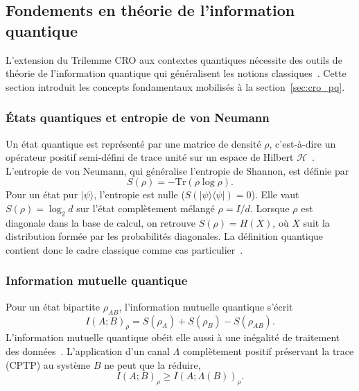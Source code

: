 \subsection{Fondements en th\'eorie de l'information quantique}
\label{subsec:fondements_info_quantique}
\begin{sloppypar}
L'extension du Trilemme CRO
aux contextes quantiques n\'ecessite des outils de th\'eorie de l'information
quantique qui g\'en\'eralisent les notions classiques~\cite{NielsenChuang2010,Wilde2017,Holevo1973}. Cette section introduit
les concepts fondamentaux mobilis\'es \`a la section~\ref{sec:cro_pq}.

\subsubsection{\'Etats quantiques et entropie de von Neumann}
\label{subsubsec:von_neumann}

Un \'etat quantique est repr\'esent\'e par une matrice de densit\'e $\rho$, c'est-\`a-dire un
op\'erateur positif semi-d\'efini de trace unit\'e sur un espace de Hilbert $\mathcal{H}$~\cite{NielsenChuang2010}.
L'entropie de von Neumann, qui g\'en\'eralise l'entropie de Shannon, est d\'efinie par
\begin{equation}
S(\rho) = -\mathrm{Tr}(\rho \log \rho).
\label{eq:von_neumann}
\end{equation}
Pour un \'etat pur $|\psi\rangle$, l'entropie est nulle ($S(|\psi\rangle\langle\psi|) = 0$). Elle
vaut $S(\rho) = \log_2 d$ sur l'\'etat compl\`etement m\'elang\'e $\rho = I/d$. Lorsque
$\rho$ est diagonale dans la base de calcul, on retrouve $S(\rho) = H(X)$, o\`u $X$
suit la distribution form\'ee par les probabilit\'es diagonales. La d\'efinition quantique
contient donc le cadre classique comme cas particulier~\cite{Wilde2017,Hiai1991}.

\subsubsection{Information mutuelle quantique}
\label{subsubsec:info_mutuelle_quantique}

Pour un \'etat bipartite $\rho_{AB}$, l'information mutuelle quantique s'\'ecrit
\begin{equation}
I(A;B)_\rho = S(\rho_A) + S(\rho_B) - S(\rho_{AB}).
\label{eq:qmi}
\end{equation}
L'information mutuelle quantique ob\'eit elle aussi \`a une in\'egalit\'e de traitement
des donn\'ees~\cite{Lindblad}. L'application d'un canal $\Lambda$ compl\`etement positif pr\'eservant la trace (CPTP) au
syst\`eme $B$ ne peut que la r\'eduire,
\begin{equation}
I(A;B)_\rho \geq I(A; \Lambda(B))_\rho.
\label{eq:qdpi}
\end{equation}


\end{sloppypar}
